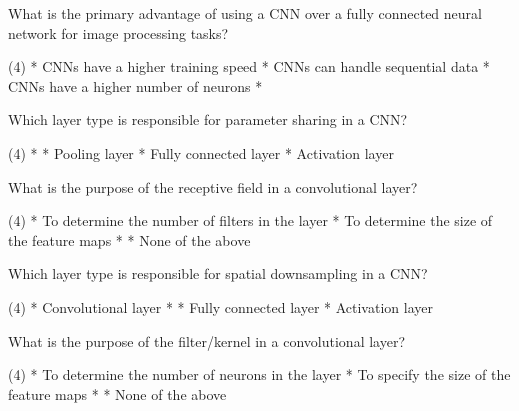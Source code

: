 \documentclass[10pt]{extarticle}
\begin{document}
\begin{exercise}
    What is the primary advantage of using a CNN over a fully connected neural network for image processing tasks?
    \begin{choice} (4)
        * CNNs have a higher training speed
        * CNNs can handle sequential data
        * CNNs have a higher number of neurons
        * 
    \end{choice}
\end{exercise}
\begin{solution}
\end{solution}

\begin{exercise}
    Which layer type is responsible for parameter sharing in a CNN?
    \begin{choice} (4)
        * 
        * Pooling layer
        * Fully connected layer
        * Activation layer
    \end{choice}
\end{exercise}
\begin{solution}
\end{solution}

\begin{exercise}
    What is the purpose of the receptive field in a convolutional layer?
    \begin{choice} (4)
        * To determine the number of filters in the layer
        * To determine the size of the feature maps
        * 
        * None of the above
    \end{choice}
\end{exercise}
\begin{solution}
\end{solution}

\begin{exercise}
    Which layer type is responsible for spatial downsampling in a CNN?
    \begin{choice} (4)
        * Convolutional layer
        * 
        * Fully connected layer
        * Activation layer
    \end{choice}
\end{exercise}
\begin{solution}
\end{solution}

\begin{exercise}
    What is the purpose of the filter/kernel in a convolutional layer?
    \begin{choice} (4)
        * To determine the number of neurons in the layer
        * To specify the size of the feature maps
        * 
        * None of the above
    \end{choice}
\end{exercise}
\begin{solution}
\end{solution}
\end{document}
